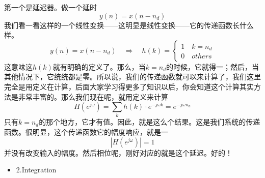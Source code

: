 \documentclass[a4paper,12pt]{article}
\begin{document}
第一个是延迟器。做一个延时
\begin{equation}
   y(n) = x(n-n_d)
\end{equation}
我们看一看这样的一个线性变换——这明显是线性变换——它的传递函数长什么样。
\begin{equation}
   y(n) = x(n-n_d)\quad\Longrightarrow\quad h(k) = \left\{\begin{matrix}
 1\quad k=n_d\\
0\quad others
\end{matrix}\right.
\end{equation}
这意味这$h(k)$就有明确的定义了。那么，当$k = n_d$的时候，它就得一；然后，当其他情况下，它统统都是零。所以说，我们的传递函数就可以来计算了，我们这里完全是用定义在计算，后面大家学习得更多了知识以后，你会知道这个计算其实方法是非常丰富的。那么我们现在呢，就用定义来计算
\begin{equation}
   H\left (  e^{j\omega} \right ) = \sum_k h(k)\cdot e^{-j\omega k} = e^{-j \omega n_d}
\end{equation}
只有$k=n_d$的那个地方，它才有值。因此，就是这么个结果。这是我们系统的传递函数。很明显，这个传递函数它的幅度响应，就是一
\begin{equation}
   \left |  H\left (  e^{j\omega} \right ) \right | = 1
\end{equation}
并没有改变输入的幅度。然后相位呢，刚好对应的就是这个延迟。好的！
\begin{itemize}
    \item 2.\quad Integration
\end{itemize}
\end{document}
